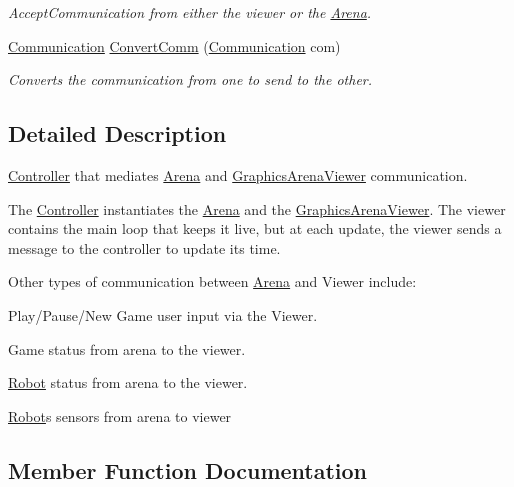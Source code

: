 \begin{DoxyCompactItemize}
\begin{DoxyCompactList}\small\item\em Accept\+Communication from either the viewer or the \hyperlink{classArena}{Arena}. \end{DoxyCompactList}\item 
\hyperlink{communication_8h_a836c27e2d64d0efa4a526150bdf6f3e5}{Communication} \hyperlink{classController_ae9b0504ab74cdacc654528b609074adc}{Convert\+Comm} (\hyperlink{communication_8h_a836c27e2d64d0efa4a526150bdf6f3e5}{Communication} com)
\begin{DoxyCompactList}\small\item\em Converts the communication from one to send to the other. \end{DoxyCompactList}\end{DoxyCompactItemize}


\subsection{Detailed Description}
\hyperlink{classController}{Controller} that mediates \hyperlink{classArena}{Arena} and \hyperlink{classGraphicsArenaViewer}{Graphics\+Arena\+Viewer} communication. 

The \hyperlink{classController}{Controller} instantiates the \hyperlink{classArena}{Arena} and the \hyperlink{classGraphicsArenaViewer}{Graphics\+Arena\+Viewer}. The viewer contains the main loop that keeps it live, but at each update, the viewer sends a message to the controller to update its time.

Other types of communication between \hyperlink{classArena}{Arena} and Viewer include\+:
\begin{DoxyItemize}
\item Play/\+Pause/\+New Game user input via the Viewer.
\item Game status from arena to the viewer.
\item \hyperlink{classRobot}{Robot} status from arena to the viewer.
\item \hyperlink{classRobot}{Robot}\textquotesingle{}s sensors from arena to viewer 
\end{DoxyItemize}

\subsection{Member Function Documentation}
